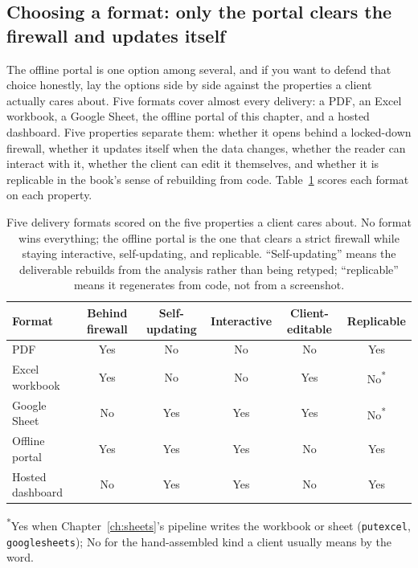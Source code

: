 \documentclass[
    a4paper,
    fontsize=10pt,
    twoside=true,
    numbers=noenddot,
]{kaobook}
\begin{document}
\subsection{Choosing a format: only the portal clears the firewall and updates itself}
The offline portal is one option among several, and if you want to defend that choice honestly, lay the options side by side against the properties a client actually cares about. Five formats cover almost every delivery: a PDF, an Excel workbook, a Google Sheet, the offline portal of this chapter, and a hosted dashboard. Five properties separate them: whether it opens behind a locked-down firewall, whether it updates itself when the data changes, whether the reader can interact with it, whether the client can edit it themselves, and whether it is replicable in the book's sense of rebuilding from code. Table~\ref{tab:formats} scores each format on each property.

\begin{table}[htbp]
\centering
\footnotesize
\caption[Delivery formats compared]{Five delivery formats scored on the five properties a client cares about. No format wins everything; the offline portal is the one that clears a strict firewall while staying interactive, self-updating, and replicable. \enquote{Self-updating} means the deliverable rebuilds from the analysis rather than being retyped; \enquote{replicable} means it regenerates from code, not from a screenshot.}
\label{tab:formats}
\begin{tabular}{lccccc}
\hline
Format & Behind firewall & Self-updating & Interactive & Client-editable & Replicable \\
\hline
PDF               & Yes & No  & No  & No  & Yes \\
Excel workbook    & Yes & No  & No  & Yes & No\textsuperscript{*} \\
Google Sheet      & No  & Yes & Yes & Yes & No\textsuperscript{*} \\
Offline portal    & Yes & Yes & Yes & No  & Yes \\
Hosted dashboard  & No  & Yes & Yes & No  & Yes \\
\hline
\end{tabular}

{\footnotesize\textsuperscript{*}Yes when Chapter~\ref{ch:sheets}'s pipeline writes the workbook or sheet (\texttt{putexcel}, \texttt{googlesheets}); No for the hand-assembled kind a client usually means by the word.}
\end{table}
\end{document}
